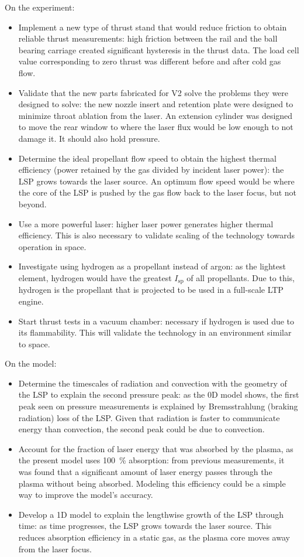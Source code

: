         On the experiment:
        \begin{itemize}
            \item Implement a new type of thrust stand that would reduce friction to obtain reliable thrust measurements: high friction between the rail and the ball bearing carriage created significant hysteresis in the thrust data. The load cell value corresponding to zero thrust was different before and after cold gas flow.
            \item Validate that the new parts fabricated for V2 solve the problems they were designed to solve: the new nozzle insert and retention plate were designed to minimize throat ablation from the laser. An extension cylinder was designed to move the rear window to where the laser flux would be low enough to not damage it. It should also hold pressure.
            \item Determine the ideal propellant flow speed to obtain the highest thermal efficiency (power retained by the gas divided by incident laser power): the LSP grows towards the laser source. An optimum flow speed would be where the core of the LSP is pushed by the gas flow back to the laser focus, but not beyond. 
            \item Use a more powerful laser: higher laser power generates higher thermal efficiency. This is also necessary to validate scaling of the technology towards operation in space.
            \item Investigate using hydrogen as a propellant instead of argon: as the lightest element, hydrogen would have the greatest $I_\mathrm{sp}$ of all propellants. Due to this, hydrogen is the propellant that is projected to be used in a full-scale LTP engine.
            \item Start thrust tests in a vacuum chamber: necessary if hydrogen is used due to its flammability. This will validate the technology in an environment similar to space.
        \end{itemize}

        On the model:
        \begin{itemize}
            \item Determine the timescales of radiation and convection with the geometry of the LSP to explain the second pressure peak: as the 0D model shows, the first peak seen on pressure measurements is explained by Bremsstrahlung (braking radiation) loss of the LSP. Given that radiation is faster to communicate energy than convection, the second peak could be due to convection.
            \item Account for the fraction of laser energy that was absorbed by the plasma, as the present model uses \qty{100}{\%} absorption: from previous measurements, it was found that a significant amount of laser energy passes through the plasma without being absorbed. Modeling this efficiency could be a simple way to improve the model's accuracy.
            \item Develop a 1D model to explain the lengthwise growth of the LSP through time: as time progresses, the LSP grows towards the laser source. This reduces absorption efficiency in a static gas, as the plasma core moves away from the laser focus.
        \end{itemize}
        